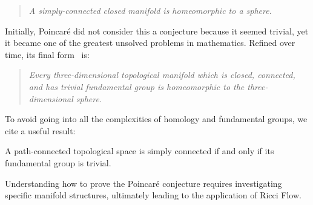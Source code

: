 \begin{quotation}
    \noindent \emph{A simply-connected closed manifold is homeomorphic to a sphere}.
\end{quotation}

Initially, Poincaré did not consider this a conjecture because it seemed trivial, yet it became one of the greatest unsolved problems in mathematics. Refined over time, its final form~\cite{poincare:complement} is:

\begin{quotation}
    \noindent \emph{Every three-dimensional topological manifold which is closed, connected, and has trivial fundamental group is homeomorphic to the three-dimensional sphere.}
\end{quotation}

To avoid going into all the complexities of homology and fundamental groups, we cite a useful result:

\begin{theorem}
    A path-connected topological space is simply connected if and only if its fundamental group is trivial.
\end{theorem}

Understanding how to prove the Poincaré conjecture requires investigating specific manifold structures, ultimately leading to the application of Ricci Flow.